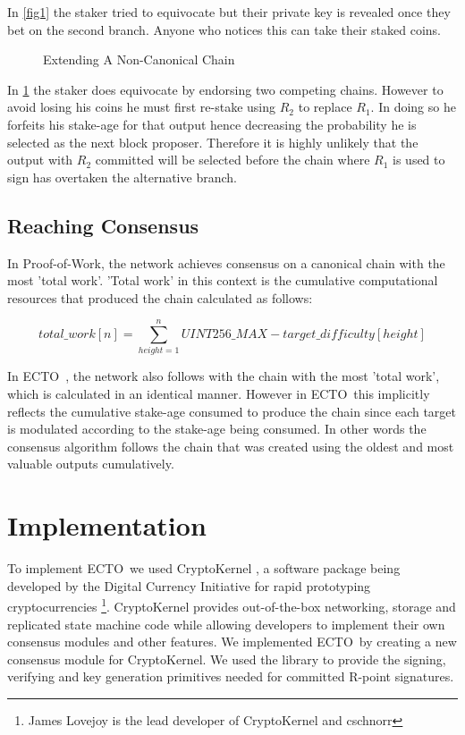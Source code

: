 \documentclass{article}
\newcommand{\coin}{ \textsc{ECTO}\ }
\begin{document}
In \ref{fig1} the staker tried to equivocate but their private key is revealed once they bet on the second branch. Anyone who notices this can take their staked coins.

\begin{figure}[!h]
	\caption{Extending A Non-Canonical Chain}
	\label{fig2}
	\centering
{}
\end{figure}
 
 In \ref{fig2} the staker does equivocate by endorsing two competing chains. However to avoid losing his coins he must first re-stake using $ R_2 $ to replace $ R_1 $. In doing so he forfeits his stake-age for that output hence decreasing the probability he is selected as the next block proposer. Therefore it is highly unlikely that the output with $ R_2 $ committed will be selected before the chain where $ R_1 $ is used to sign has overtaken the alternative branch.
 
\subsection{Reaching Consensus}
In Proof-of-Work, the network achieves consensus on a canonical chain with the most 'total work'. 'Total work' in this context is the cumulative computational resources that produced the chain calculated as follows:

$$ total\_work[n] = \sum_{height=1}^{n} UINT256\_MAX - target\_difficulty[height] $$

In \coin, the network also follows with the chain with the most 'total work', which is calculated in an identical manner. However in \coin this implicitly reflects the cumulative stake-age consumed to produce the chain since each target is modulated according to the stake-age being consumed. In other words the consensus algorithm follows the chain that was created using the oldest and most valuable outputs cumulatively.  


\section{Implementation}
To implement \coin we used CryptoKernel \cite{ck}, a software package being developed by the Digital Currency Initiative for rapid prototyping cryptocurrencies \footnote{James Lovejoy is the lead developer of CryptoKernel and cschnorr}. CryptoKernel provides out-of-the-box networking, storage and replicated state machine code while allowing developers to implement their own consensus modules and other features. We implemented \coin by creating a new consensus module for CryptoKernel. We used the \cite{cschnorr} library to provide the signing, verifying and key generation primitives needed for committed R-point signatures.
\end{document}
